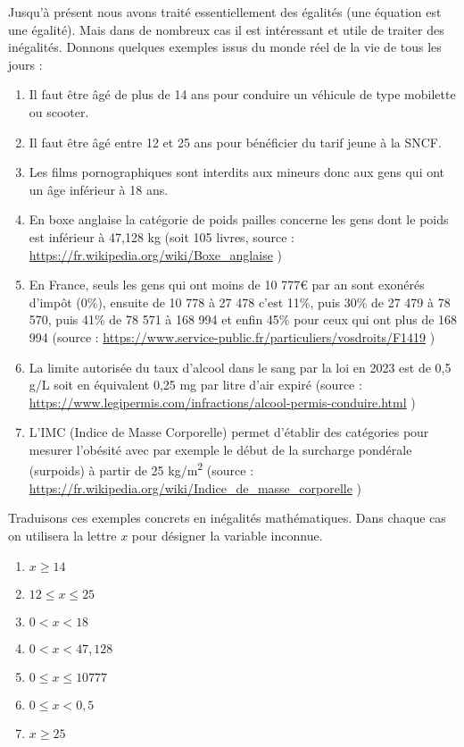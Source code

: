 \documentclass[11pt]{article}
\begin{document}
Jusqu'à présent nous avons traité essentiellement des égalités (une
équation est une égalité). Mais dans de nombreux cas il est
intéressant et utile de traiter des inégalités. Donnons quelques
exemples issus du monde réel de la vie de tous les jours :
\begin{enumerate}
\item Il faut être âgé de plus de 14 ans pour conduire un véhicule de
type mobilette ou scooter.
\item Il faut être âgé entre 12 et 25 ans pour bénéficier du tarif
jeune à la SNCF.
\item Les films pornographiques sont interdits aux mineurs donc aux
gens qui ont un âge inférieur à 18 ans.
\item En boxe anglaise la catégorie de poids pailles concerne les gens
dont le poids est inférieur à 47,128 kg (soit 105 livres, source :
\url{https://fr.wikipedia.org/wiki/Boxe\_anglaise} )
\item En France, seuls les gens qui ont moins de 10 777€ par an sont
exonérés d'impôt (0\%), ensuite de 10 778 à 27 478 c'est 11\%,
puis 30\% de 27 479 à 78 570, puis 41\% de 78 571 à 168 994 et
enfin 45\% pour ceux qui ont plus de 168 994 (source :
\url{https://www.service-public.fr/particuliers/vosdroits/F1419} )
\item La limite autorisée du taux d'alcool dans le sang par la loi en
2023 est de 0,5 g/L soit en équivalent 0,25 mg par litre d'air
expiré (source :
\url{https://www.legipermis.com/infractions/alcool-permis-conduire.html}
)
\item L'IMC (Indice de Masse Corporelle) permet d'établir des
catégories pour mesurer l'obésité avec par exemple le début de la
surcharge pondérale (surpoids) à partir de 25 kg/m\textsuperscript{2} (source :
\url{https://fr.wikipedia.org/wiki/Indice\_de\_masse\_corporelle} )
\end{enumerate}

Traduisons ces exemples concrets en inégalités mathématiques. Dans
chaque cas on utilisera la lettre \(x\) pour désigner la variable
inconnue.

\begin{enumerate}
\item \(x \geq 14\)
\item \(12 \leq x \leq 25\)
\item \(0 < x < 18\)
\item \(0 < x < 47,128\)
\item \(0 \leq x \leq 10 777\)
\item \(0 \leq x < 0,5\)
\item \(x \geq 25\)
\end{enumerate}
\end{document}
